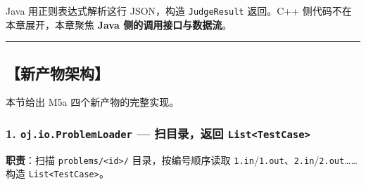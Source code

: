 \documentclass[
  11pt,
]{ctexart}
\begin{document}
Java 用正则表达式解析这行 JSON，构造 \texttt{JudgeResult} 返回。C++
侧代码不在本章展开，本章聚焦 \textbf{Java 侧的调用接口与数据流}。

\begin{center}\rule{0.5\linewidth}{0.5pt}\end{center}

\hypertarget{ux65b0ux4ea7ux7269ux67b6ux6784-1}{%
\subsection{【新产物架构】}\label{ux65b0ux4ea7ux7269ux67b6ux6784-1}}

本节给出 M5a 四个新产物的完整实现。

\hypertarget{oj.io.problemloader-ux626bux76eeux5f55ux8fd4ux56de-listtestcase}{%
\subsubsection{\texorpdfstring{1. \texttt{oj.io.ProblemLoader} ---
扫目录，返回
\texttt{List\textless{}TestCase\textgreater{}}}{1. oj.io.ProblemLoader --- 扫目录，返回 List\textless TestCase\textgreater{}}}\label{oj.io.problemloader-ux626bux76eeux5f55ux8fd4ux56de-listtestcase}}

\textbf{职责}：扫描 \texttt{problems/\textless{}id\textgreater{}/}
目录，按编号顺序读取
\texttt{1.in}/\texttt{1.out}、\texttt{2.in}/\texttt{2.out}\ldots\ldots 构造
\texttt{List\textless{}TestCase\textgreater{}}。
\end{document}
